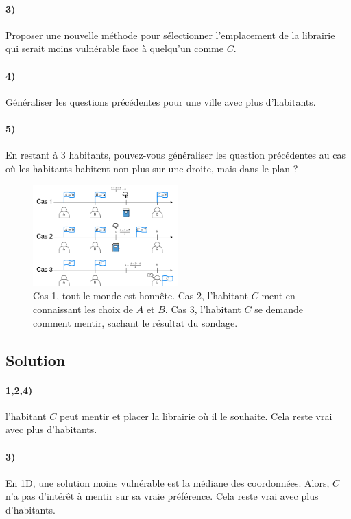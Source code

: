 \documentclass[a4paper,10pt,oneside]{article}
\begin{document}
\paragraph*{3)} 
Proposer une nouvelle méthode pour sélectionner l'emplacement de la librairie qui serait moins vulnérable face à quelqu'un comme $C$.

\paragraph*{4)} Généraliser les questions précédentes pour une ville avec plus d'habitants.

\paragraph*{5)} En restant à 3 habitants, pouvez-vous généraliser les question précédentes au cas où les habitants habitent non plus sur une droite, mais dans le plan ? 


\begin{figure}[!h]
  \centering
  \includegraphics[width=0.50\textwidth]{figures/library.png}
  \caption{
    Cas 1, tout le monde est honnête. 
    Cas 2, l'habitant $C$ ment en connaissant les choix de $A$ et $B$. 
    Cas 3, l'habitant $C$ se demande comment mentir, sachant le résultat du sondage.}
\end{figure}

\subsection{Solution}

\paragraph*{1,2,4)} 
l'habitant $C$ peut mentir et placer la librairie où il le souhaite. Cela reste vrai avec plus d'habitants.

\paragraph*{3)} 
En 1D, une solution moins vulnérable est la médiane des coordonnées. 
Alors, $C$ n'a pas d'intérêt à mentir sur sa vraie préférence. Cela reste vrai avec plus d'habitants.
\end{document}
